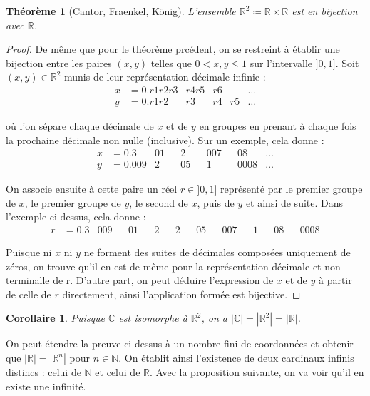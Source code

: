 \documentclass{article}
\theoremstyle{definition}
\theoremstyle{plain}
\newtheorem{theorem}[subsubsection]{Théorème}
\theoremstyle{plain}
\newtheorem{corollary}[subsubsection]{Corollaire}
\theoremstyle{plain}
\theoremstyle{plain}
\theoremstyle{plain}
\begin{document}
\begin{theorem}[Cantor, Fraenkel, König]
	L'ensemble \( \mathbb{R}^{2} \coloneqq \mathbb{R} \times \mathbb{R}\) est en bijection avec \( \mathbb{R} \). \cite{aigner2018proofs} 
\end{theorem}
\begin{proof}
	De même que pour le théorème prcédent, on se restreint à établir une bijection entre les paires \( (x,y) \) telles que \( 0 < x,y \le 1 \) sur l'intervalle \( ]0,1] \).
	Soit \( (x,y) \in \mathbb{R}^{2} \) munis de leur représentation décimale infinie :
	\begin{align*}
		x &= 0.r1r2r3 & r4r5 & r6 & &\ldots\\
		y &= 0.r1r2  & r3 & r4 & r5 &\ldots
	\end{align*}

	où l'on sépare chaque décimale de \( x \) et de \( y \) en groupes en prenant à chaque fois la prochaine décimale non nulle (inclusive). Sur un exemple, cela donne :
	\begin{align*}
		x &= 0.3 & 01 && 2 && 007 && 08 & \ldots\\
		y &= 0.009 & 2 && 05 && 1 && 0008 & \ldots
	\end{align*}

	On associe ensuite à cette paire un réel \( r \in ]0,1] \) représenté par le premier groupe de \( x \), le premier groupe de \( y \), le second de \( x \), puis de \( y \) et ainsi de suite.
	Dans l'exemple ci-dessus, cela donne :
	\begin{align*}
		r &= 0.3 & 009 && 01 && 2 && 2 && 05 && 007 && 1 && 08 && 0008
	\end{align*}

	Puisque ni \( x \) ni \( y \) ne forment des suites de décimales composées uniquement de zéros, on trouve qu'il en est de même pour la représentation décimale et non terminalle de r. 
	D'autre part, on peut déduire l'expression de \( x \) et de \( y \) à partir de celle de \( r \) directement, ainsi l'application formée est bijective.
\end{proof}
\begin{corollary}
	Puisque \( \mathbb{C} \) est isomorphe à \( \mathbb{R}^{2} \), on a \( |\mathbb{C}| = |\mathbb{R}^{2}| = |\mathbb{R}| \).
\end{corollary}

\par On peut étendre la preuve ci-dessus à un nombre fini de coordonnées et obtenir que \( |\mathbb{R}| = |\mathbb{R}^{n}| \) pour \( n \in \mathbb{N} \). 
On établit ainsi l'existence de deux cardinaux infinis distincs : celui de \( \mathbb{N} \) et celui de \( \mathbb{R} \). Avec la proposition suivante, on va voir qu'il en existe une infinité.
\end{document}
